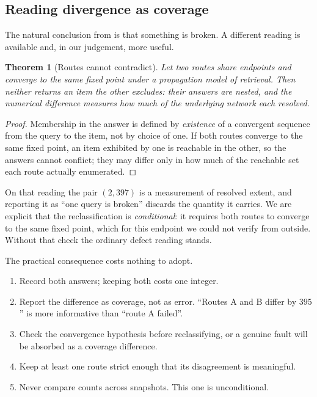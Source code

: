 \documentclass[11pt,twocolumn,a4paper]{article}
\theoremstyle{thmstyle}
\newtheorem{theorem}{Theorem}[section]
\theoremstyle{definition}
\theoremstyle{remark}
\begin{document}
\subsection{Reading divergence as coverage}

The natural conclusion from  is that something is broken. A
different reading is available and, in our judgement, more useful.

\begin{theorem}[Routes cannot contradict]
\label{thm:noncontradiction}
Let two routes share endpoints and converge to the same fixed point under a
propagation model of retrieval. Then neither returns an item the other
excludes: their answers are nested, and the numerical difference measures how
much of the underlying network each resolved.
\end{theorem}

\begin{proof}
Membership in the answer is defined by \emph{existence} of a convergent
sequence from the query to the item, not by choice of one. If both routes
converge to the same fixed point, an item exhibited by one is reachable in the
other, so the answers cannot conflict; they may differ only in how much of the
reachable set each route actually enumerated.
\end{proof}

On that reading the pair $(2,397)$ is a measurement of resolved extent, and
reporting it as ``one query is broken'' discards the quantity it carries. We
are explicit that the reclassification is \emph{conditional}: it requires both
routes to converge to the same fixed point, which for this endpoint we could
not verify from outside. Without that check the ordinary defect reading
stands.

The practical consequence costs nothing to adopt.

\begin{enumerate}[label=(P\arabic*),leftmargin=3em,itemsep=2pt]
\item Record both answers; keeping both costs one integer.
\item Report the difference as coverage, not as error. ``Routes A and B differ
      by $395$'' is more informative than ``route A failed''.
\item Check the convergence hypothesis before reclassifying, or a genuine
      fault will be absorbed as a coverage difference.
\item Keep at least one route strict enough that its disagreement is
      meaningful.
\item Never compare counts across snapshots. This one is unconditional.
\end{enumerate}
\end{document}
